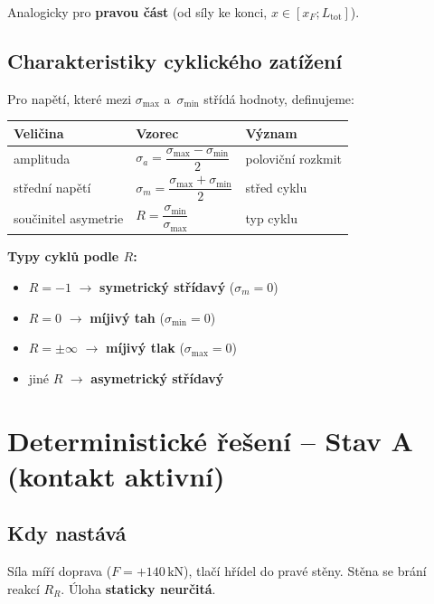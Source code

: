 \documentclass[a4paper,11pt]{article}
\newcommand{\unit}[1]{\,\mathrm{#1}}
\begin{document}
Analogicky pro \textbf{pravou část} (od síly ke konci, $x \in [x_F; L_{\mathrm{tot}}]$).

\subsection{Charakteristiky cyklického zatížení}

Pro napětí, které mezi $\sigma_{\max}$ a~$\sigma_{\min}$ střídá hodnoty, definujeme:

\begin{table}[H]
\centering
\begin{tabular}{llp{6cm}}
\toprule
\textbf{Veličina} & \textbf{Vzorec} & \textbf{Význam} \\
\midrule
amplituda                & $\sigma_a = \dfrac{\sigma_{\max} - \sigma_{\min}}{2}$ & poloviční rozkmit \\[1ex]
střední napětí          & $\sigma_m = \dfrac{\sigma_{\max} + \sigma_{\min}}{2}$ & střed cyklu \\[1ex]
součinitel asymetrie & $R = \dfrac{\sigma_{\min}}{\sigma_{\max}}$ & typ cyklu \\
\bottomrule
\end{tabular}
\end{table}

\textbf{Typy cyklů podle $R$:}
\begin{itemize}[nosep]
    \item $R = -1$ $\to$ \textbf{symetrický střídavý} ($\sigma_m = 0$)
    \item $R = 0$ $\to$ \textbf{míjivý tah} ($\sigma_{\min} = 0$)
    \item $R = \pm\infty$ $\to$ \textbf{míjivý tlak} ($\sigma_{\max} = 0$)
    \item jiné $R$ $\to$ \textbf{asymetrický střídavý}
\end{itemize}

\section{Deterministické řešení -- Stav A (kontakt aktivní)}

\subsection{Kdy nastává}

Síla míří doprava ($F = +140\unit{kN}$), tlačí hřídel do pravé stěny. Stěna se brání reakcí $R_R$. Úloha \textbf{staticky neurčitá}.
\end{document}
